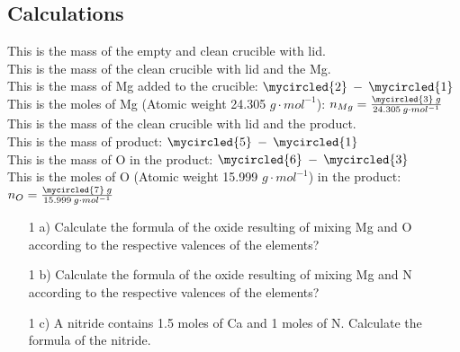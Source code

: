 \documentclass[main.tex]{subfiles}
\begin{document}
\newpage 
\begin{fullwidth}
\subsection*{Calculations}
 This is the mass of the empty and clean crucible with lid.\vspace{0.5cm}\\
 This is the mass of the clean crucible with lid and the Mg.\vspace{0.5cm}\\
 This is the mass of Mg added to the crucible: $\mycircled{2}\: - \: \mycircled{1}$ \vspace{0.5cm}\\
 This is the moles of Mg (Atomic weight 24.305 $g\cdot mol^{-1}$):
$n_{Mg}=\frac{\mycircled{3}\: g}{24.305 \: g\cdot mol^{-1}}$\vspace{0.5cm}\\
 This is the mass of the clean crucible with lid and the product.\vspace{0.5cm}\\
 This is the mass of product: $\mycircled{5} \: - \: \mycircled{1}$ \vspace{0.5cm}\\
 This is the mass of O in the product: $\mycircled{6} \: - \: \mycircled{3} $ \vspace{0.5cm}\\
 This is the moles of O (Atomic weight 15.999 $g\cdot mol^{-1}$) in the product: $n_{O}=\frac{\mycircled{7} \:g}{15.999 \:g\cdot mol^{-1}}$


\vspace{0.6cm}{\large \bfseries PostLab questions }
\begin{enumerate}
\item[1 a)] Calculate the formula of the oxide resulting of mixing Mg and O according to the respective valences of the elements?
\vspace{4.cm}
\item[1 b)] Calculate the formula of the oxide resulting of mixing Mg and N according to the respective valences of the elements?
\vspace{4.cm}
\item[1 c)] A nitride contains 1.5 moles of Ca and 1 moles of N. Calculate the formula of the nitride.
\vspace{4.cm}
\end{enumerate}

\end{fullwidth}
\end{document}
